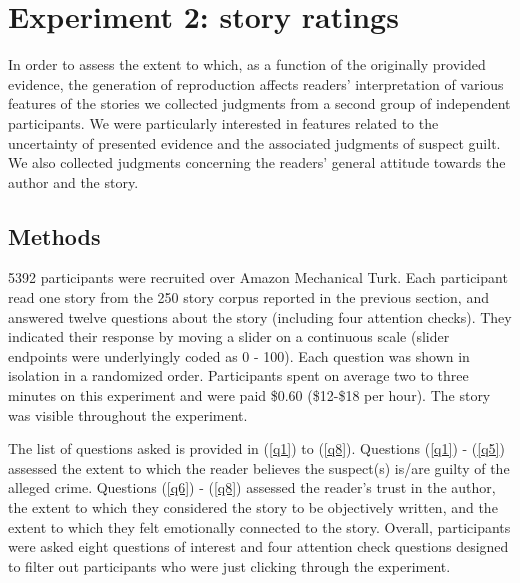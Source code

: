 \documentclass[10pt,letterpaper]{article}
\begin{document}
\section{Experiment 2: story ratings}

In order to assess the extent to which, as a function of the originally provided evidence, the generation of reproduction affects readers' interpretation of various features of the stories we collected judgments from a second group of independent participants. We were particularly interested in features related to the uncertainty of presented evidence and the associated judgments of suspect guilt. We also collected judgments concerning the readers' general attitude towards the author and the story.

\subsection{Methods}

5392 participants were recruited over Amazon Mechanical Turk. Each participant read one story from the 250 story corpus reported in the previous section, and answered twelve questions about the story (including four attention checks). They indicated their response by moving a slider on a continuous scale (slider endpoints were underlyingly coded as 0 - 100). Each question was shown in isolation in a randomized order. Participants spent on average two to three minutes on this experiment and were paid \$0.60 (\$12-\$18 per hour). The story was visible throughout the experiment.


The list of questions asked is provided in (\ref{q1}) to (\ref{q8}). Questions (\ref{q1}) - (\ref{q5}) assessed the extent to which the reader believes the suspect(s) is/are guilty of the alleged crime. Questions (\ref{q6}) - (\ref{q8}) assessed the  reader's trust in the author, the extent to which they considered the story to be objectively written, and the extent to which they felt emotionally connected to the story. Overall, participants were asked eight questions of interest and four attention check questions designed to filter out participants who were just clicking through the experiment. %
\end{document}
